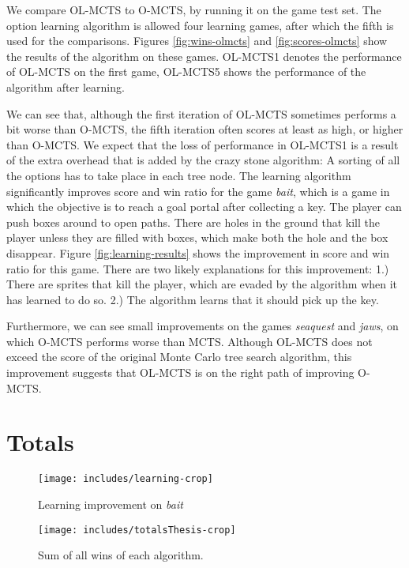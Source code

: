 We compare OL-MCTS to O-MCTS, by running it on the game test set.  The option
learning algorithm is allowed four learning games, after which the fifth is used
for the comparisons. Figures \ref{fig:wins-olmcts} and \ref{fig:scores-olmcts}
show the results of the algorithm on these games.  OL-MCTS1 denotes the
performance of OL-MCTS on the first game, OL-MCTS5 shows the performance of the
algorithm after learning. 

We can see that, although the first iteration of OL-MCTS sometimes performs a
bit worse than O-MCTS, the fifth iteration often scores at least as high, or
higher than O-MCTS. We expect that the loss of performance in OL-MCTS1 is
a result of the extra overhead that is added by the crazy stone algorithm: A
sorting of all the options has to take place in each tree node. The learning
algorithm significantly improves score and win ratio for the game \textit{bait},
which is a game in which the objective is to reach a goal portal after
collecting a key.  The player can push boxes around to open paths. There are
holes in the ground that kill the player unless they are filled with boxes,
which make both the hole and the box disappear. Figure
\ref{fig:learning-results} shows the improvement in score and win ratio for this
game. There are two likely explanations for this improvement: 1.) There are
sprites that kill the player, which are evaded by the algorithm when it has
learned to do so.  2.) The algorithm learns that it should pick up the key.

Furthermore, we can see small improvements on the games \textit{seaquest} and
\textit{jaws}, on which O-MCTS performs worse than MCTS.  Although OL-MCTS does
not exceed the score of the original Monte Carlo tree search algorithm, this
improvement suggests that OL-MCTS is on the right path of improving O-MCTS.

\section{Totals}
\label{subsec:totals}

\begin{figure}
	\hfill
	\begin{minipage}{.45\textwidth}
		\begin{center}
			\texttt{[image: includes/learning-crop]}
			\caption{Learning improvement on \textit{bait}}
			\label{fig:learning-results}
		\end{center}
	\end{minipage}
	\hfill
	\begin{minipage}{.45\textwidth}
		\texttt{[image: includes/totalsThesis-crop]}
		\caption{Sum of all wins of each algorithm.}
		\label{fig:total-results}
	\end{minipage}
	\hfill
\end{figure}

